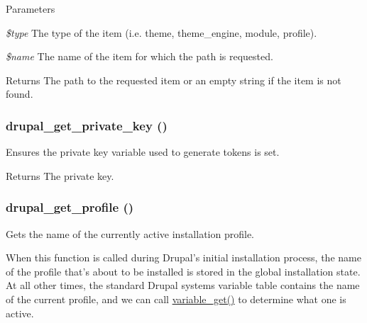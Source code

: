 \begin{DoxyParams}{Parameters}
\item[{\em \$type}]The type of the item (i.e. theme, theme\_\-engine, module, profile). \item[{\em \$name}]The name of the item for which the path is requested.\end{DoxyParams}
\begin{DoxyReturn}{Returns}
The path to the requested item or an empty string if the item is not found. 
\end{DoxyReturn}
\hypertarget{common_8inc_a73373e2d357d0e624c209efe27515af6}{
\subsubsection[{drupal\_\-get\_\-private\_\-key}]{\setlength{\rightskip}{0pt plus 5cm}drupal\_\-get\_\-private\_\-key ()}}
\label{common_8inc_a73373e2d357d0e624c209efe27515af6}
Ensures the private key variable used to generate tokens is set.

\begin{DoxyReturn}{Returns}
The private key. 
\end{DoxyReturn}
\hypertarget{common_8inc_a4128f0023ccec2d1a9a40987f0131d83}{
\subsubsection[{drupal\_\-get\_\-profile}]{\setlength{\rightskip}{0pt plus 5cm}drupal\_\-get\_\-profile ()}}
\label{common_8inc_a4128f0023ccec2d1a9a40987f0131d83}
Gets the name of the currently active installation profile.

When this function is called during Drupal's initial installation process, the name of the profile that's about to be installed is stored in the global installation state. At all other times, the standard Drupal systems variable table contains the name of the current profile, and we can call \hyperlink{bootstrap_8inc_a1be2160d5e5a1a9b9a0c90944c4f5252}{variable\_\-get()} to determine what one is active.

